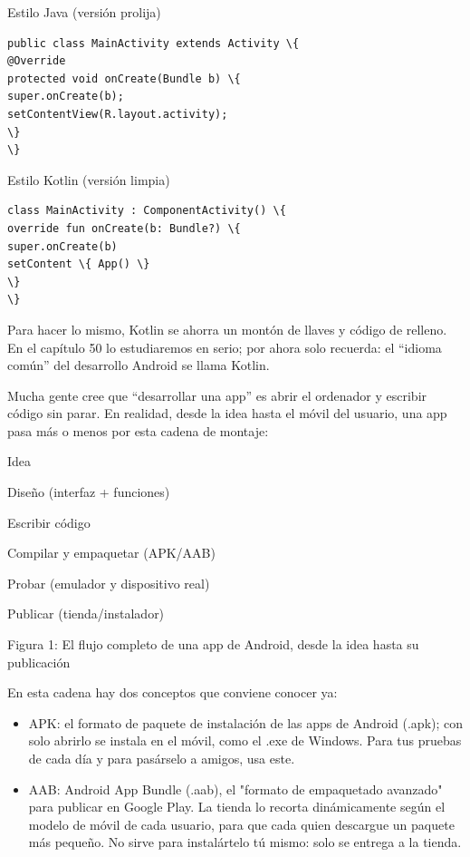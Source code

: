 Estilo Java (versión prolija)

\begin{lstlisting}
public class MainActivity extends Activity \{
@Override
protected void onCreate(Bundle b) \{
super.onCreate(b);
setContentView(R.layout.activity);
\}
\}
\end{lstlisting}

Estilo Kotlin (versión limpia)

\begin{lstlisting}
class MainActivity : ComponentActivity() \{
override fun onCreate(b: Bundle?) \{
super.onCreate(b)
setContent \{ App() \}
\}
\}
\end{lstlisting}

Para hacer lo mismo, Kotlin se ahorra un montón de llaves y código de relleno. En el capítulo 50 lo estudiaremos en serio; por ahora solo recuerda: el “idioma común” del desarrollo Android se llama Kotlin.


Mucha gente cree que “desarrollar una app” es abrir el ordenador y escribir código sin parar. En realidad, desde la idea hasta el móvil del usuario, una app pasa más o menos por esta cadena de montaje:

Idea

Diseño (interfaz + funciones)

Escribir código

Compilar y empaquetar (APK/AAB)

Probar (emulador y dispositivo real)

Publicar (tienda/instalador)

\begin{center}\small\color{gray}Figura 1: El flujo completo de una app de Android, desde la idea hasta su publicación\end{center}

En esta cadena hay dos conceptos que conviene conocer ya:

\begin{itemize}
  \item APK: el formato de paquete de instalación de las apps de Android (.apk); con solo abrirlo se instala en el móvil, como el .exe de Windows. Para tus pruebas de cada día y para pasárselo a amigos, usa este.
  \item AAB: Android App Bundle (.aab), el "formato de empaquetado avanzado" para publicar en Google Play. La tienda lo recorta dinámicamente según el modelo de móvil de cada usuario, para que cada quien descargue un paquete más pequeño. No sirve para instalártelo tú mismo: solo se entrega a la tienda.
\end{itemize}

